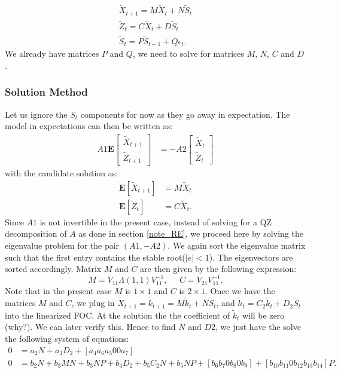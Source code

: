 \documentclass[12pt]{article}
\begin{document}
\begin{gather*}
\tilde{X}_{t+1} = M \tilde{X}_t + N \tilde{S}_t \\
\tilde{Z}_t = C \tilde{X}_t + D \tilde{S}_t\\
\tilde{S}_t = P \tilde{S}_{t-1} + Q \epsilon_t.
\end{gather*}
We already have matrices $P$ and $Q$, we need to solve for matrices $M$, $N$, $C$ and $D$. 



\subsubsection{Solution Method}
Let us ignore the $S_t$ components for now as they go away in expectation. The model in expectations can then be written as:
\begin{align*}
A1\mathbf{E} \begin{bmatrix} \tilde{X}_{t+1} \\ \tilde{Z}_{t+1} \end{bmatrix} & = -A2 \begin{bmatrix} \tilde{X}_t \\ \tilde{Z}_t \end{bmatrix}
\end{align*}
with the candidate solution as:
\begin{align*}
\mathbf{E}[\tilde{X}_{t+1}]& = M \tilde{X}_t \\
\mathbf{E}[\tilde{Z}_t] & = C \tilde{X}_t.
\end{align*}
Since $A1$ is not invertible in the present case, instead of solving for a QZ decomposition of $A$ as done in section \ref{note_RE}, we proceed here by solving the eigenvalue problem for the pair $(A1, -A2)$. We again sort the eigenvalue matrix such that the first entry contains the stable root($|e|<1$). The eigenvectors are sorted accordingly. Matrix $M$ and $C$ are then given by the following expression:
$$M =V_{11}\Lambda(1, 1)V_{11}^{-1}, \; \; \; \; \;  C = V_{ 2 1} V_{1 1}^{-1} .$$
Note that in the present case $M$ is $1 \times 1$ and $C$ is $2 \times 1$. Once we have the matrices $M$ and $C$, we plug in $\tilde{X}_{t+1} = \tilde{k}_{t+1} = M\tilde{k}_t + N \tilde{S}_t$, and $\tilde{h}_t = C_2 \tilde{k}_t + D_2\tilde{S}_t$ into the linearized FOC. At the solution the the coefficient of $\tilde{k}_t$ will be zero (why?). We can later verify this. Hence to find $N$ and $D2$, we just have the solve the following system of equations:
\begin{align*}
0 &= a_2N + a_3D_2 + [a_4 a_6 a_5 0 0 a_7] \\
0 &= b_2N + b_3 MN + b_3NP + b_4D_2 + b_5C_2N + b_5NP + [b_6 b_7 0 b_8 0 b_9] + [b_{10} b_{11} 0 b_{12} b_{13} b_{14}]P.
\end{align*}
\end{document}
